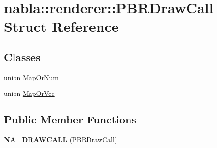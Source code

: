 \hypertarget{structnabla_1_1renderer_1_1_p_b_r_draw_call}{}\section{nabla\+::renderer\+::P\+B\+R\+Draw\+Call Struct Reference}
\label{structnabla_1_1renderer_1_1_p_b_r_draw_call}
\subsection*{Classes}
\begin{DoxyCompactItemize}
\item 
union \mbox{\hyperlink{unionnabla_1_1renderer_1_1_p_b_r_draw_call_1_1_map_or_num}{Map\+Or\+Num}}
\item 
union \mbox{\hyperlink{unionnabla_1_1renderer_1_1_p_b_r_draw_call_1_1_map_or_vec}{Map\+Or\+Vec}}
\end{DoxyCompactItemize}
\subsection*{Public Member Functions}
\begin{DoxyCompactItemize}
\item 
\mbox{\label{structnabla_1_1renderer_1_1_p_b_r_draw_call_a7224396aee40d57c014ebcf23bc2a2a3}} 
{\bfseries N\+A\+\_\+\+D\+R\+A\+W\+C\+A\+LL} (\mbox{\hyperlink{structnabla_1_1renderer_1_1_p_b_r_draw_call}{P\+B\+R\+Draw\+Call}})
\end{DoxyCompactItemize}

